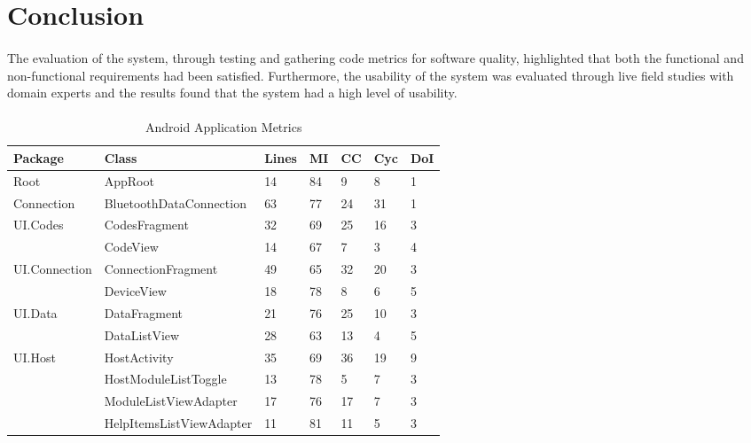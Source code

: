 {{\section{Conclusion}
	\paragraph{}{
	The evaluation of the system, through testing and gathering code metrics for software quality, highlighted that both the functional and non-functional requirements had been satisfied. Furthermore, the usability of the system was evaluated through live field studies with domain experts and the results found that the system had a high level of usability.
	}		
	\paragraph{}{
	}
		
		\begin{table}[ht]
		\begin{scriptsize}			
			\begin{center}				
				\begin{tabularx}{\textwidth}{| l | X | l | l | l | l | l |}
								
				\hline
				\textbf{Package} & \textbf{Class} & \textbf{Lines} & \textbf{MI} & \textbf{CC} & \textbf{Cyc} & \textbf{DoI}\\
				\hline
				Root & AppRoot & 14 & 84 & 9 & 8 & 1\\
				\hline
				Connection & BluetoothDataConnection & 63 & 77 & 24 & 31 & 1\\
				\hline
				\multirow{2}{*}{UI.Codes} & CodesFragment & 32 & 69 & 25 & 16 & 3\\\cline{2-7}
										  & CodeView & 14 & 67 & 7 & 3 & 4\\\cline{2-7}
				\hline
				\multirow{2}{*}{UI.Connection} & ConnectionFragment & 49 & 65 & 32 & 20 & 3\\\cline{2-7}
										  	   & DeviceView & 18 & 78 & 8 & 6 & 5\\\cline{2-7}
				\hline
				\multirow{2}{*}{UI.Data} & DataFragment & 21 & 76 & 25 & 10 & 3\\\cline{2-7}
     							  	     & DataListView & 28 & 63 & 13 & 4 & 5\\\cline{2-7}
				\hline
				\multirow{4}{*}{UI.Host} & HostActivity & 35 & 69 & 36 & 19 & 9\\\cline{2-7}
										 & HostModuleListToggle & 13 & 78 & 5 & 7 & 3\\\cline{2-7}
										 & ModuleListViewAdapter & 17 & 76 & 17 & 7 & 3\\\cline{2-7}
										 & HelpItemsListViewAdapter & 11 & 81 & 11 & 5 & 3\\\cline{2-7}
				\hline
				\end{tabularx}
				\caption{Android Application Metrics}
				\label{tab:AndroidApp}
			\end{center}
		\end{scriptsize}
		\end{table}		
		
}}
